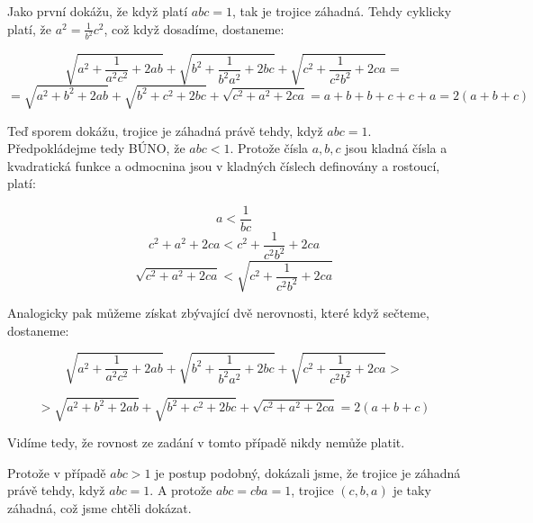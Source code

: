 \documentclass{fkssolpub}
\author{Ondřej Sedláček}
\begin{document}
Jako první dokážu, že když platí $abc = 1$, tak je trojice záhadná. Tehdy cyklicky platí, že $a^2 = \frac{1}{b^2}{c^2}$, což když dosadíme, dostaneme:

\[
  \sqrt{a^2 + \frac{1}{a^2 c^2} + 2ab} + \sqrt{b^2 + \frac{1}{b^2 a^2} + 2bc} + \sqrt{c^2 + \frac{1}{c^2 b^2} + 2ca} =
\]
\[
  = \sqrt{a^2 + b^2 + 2ab} + \sqrt{b^2 + c^2 + 2bc} + \sqrt{c^2 + a^2 + 2ca} = a + b + b + c + c + a = 2(a + b + c)
\]

Teď sporem dokážu, trojice je záhadná právě tehdy, když $abc = 1$. Předpokládejme tedy BÚNO, že $abc < 1$. Protože čísla $a,b,c$ jsou kladná čísla a kvadratická funkce a odmocnina jsou v kladných číslech definovány a rostoucí, platí:

\[
  a < \frac{1}{bc}
\]
\[
  c^2 + a^2 + 2ca < c^2 + \frac{1}{c^2 b^2} + 2ca
\]
\[
  \sqrt{c^2 + a^2 + 2ca} < \sqrt{c^2 + \frac{1}{c^2 b^2} + 2ca}
\]

Analogicky pak můžeme získat zbývající dvě nerovnosti, které když sečteme, dostaneme:

\[
  \sqrt{a^2 + \frac{1}{a^2 c^2} + 2ab} + \sqrt{b^2 + \frac{1}{b^2 a^2} + 2bc} + \sqrt{c^2 + \frac{1}{c^2 b^2} + 2ca} >
\]

\[
  > \sqrt{a^2 + b^2 + 2ab} + \sqrt{b^2 + c^2 + 2bc} + \sqrt{c^2 + a^2 + 2ca} = 2(a + b + c)
\]

Vidíme tedy, že rovnost ze zadání v tomto případě nikdy nemůže platit.

Protože v případě $abc > 1$ je postup podobný, dokázali jsme, že trojice je záhadná právě tehdy, když $abc = 1$. A protože $abc = cba = 1$, trojice $(c,b,a)$ je taky záhadná, což jsme chtěli dokázat.
\end{document}
